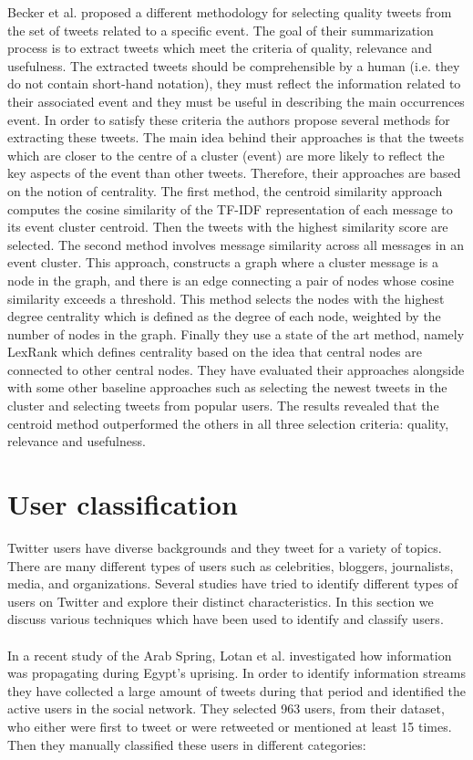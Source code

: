 Becker et al. \citep{Becker_Gravano_2010} proposed a different methodology for selecting quality tweets from the set of tweets related to a specific event. The goal of their summarization process is to extract tweets which meet the criteria of quality, relevance and usefulness. The extracted tweets should be comprehensible by a human (i.e. they do not contain short-hand notation), they must reflect the information related to their associated event and they must be useful in describing the main occurrences event. In order to satisfy these criteria the authors propose several methods for extracting these tweets. The main idea behind their approaches is that the tweets which are closer to the centre of a cluster (event) are more likely to reflect the key aspects of the event than other tweets. Therefore, their approaches are based on the notion of centrality. The first method, the centroid similarity approach computes the cosine similarity of the TF-IDF representation of each message to its event cluster centroid. Then the tweets with the highest similarity score are selected. The second method involves message similarity across all messages in an event cluster. This approach, constructs a graph where a cluster message is a node in the graph, and there is an edge connecting a pair of nodes whose cosine similarity exceeds a threshold. This method selects the nodes with the highest degree centrality which is defined as the degree of each node, weighted by the number of nodes in the graph. Finally they use a state of the art method, namely LexRank which defines centrality based on the idea that central nodes are connected to other central nodes. They have evaluated their approaches alongside with some other baseline approaches such as selecting the newest tweets in the cluster and selecting tweets from popular users. The results revealed that the centroid method outperformed the others in all three selection criteria: quality, relevance and usefulness. 

\section{User classification }\label{sec:UserClassificationBack}
Twitter users have diverse backgrounds and they tweet for a variety of topics. There are many different types of users such as celebrities, bloggers, journalists, media, and organizations. Several studies have tried to identify different types of users on Twitter and explore their distinct characteristics. In this section we discuss various techniques which have been used to identify and classify users. \\\\
In a recent study of the Arab Spring, Lotan et al. \citep{Lotan} investigated how information was propagating during Egypt's	 uprising. In order to identify information streams they have collected a large amount of tweets during that period and identified the active users in the social network. They selected 963 users, from their dataset, who either were first to tweet or were retweeted or mentioned at least 15 times. Then they manually classified these users in different categories:\\
	 
